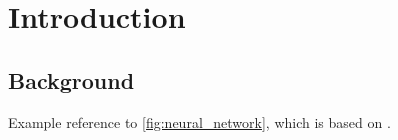 \chapter{Introduction}
\label{ch:introduction}

\setcounter{page}{1}


\section{Background}
\label{subsec:background}

Example reference to \autoref{fig:neural_network}, which is based on \cite{kim2017neural}.

